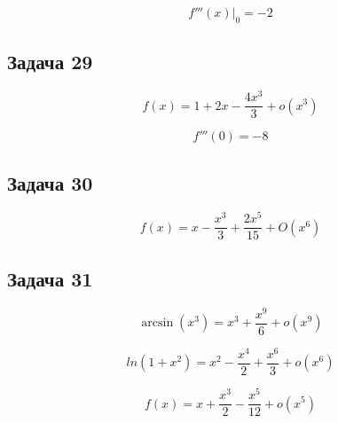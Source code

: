 \documentclass[a4paper,12pt]{article}
\begin{document}
\[
f'''(x)|_{0} =  -2
\]

\subsection{Задача 29}

\[
f(x) = 1 + 2x - \frac{4x^3}{3} + o(x^3)
\]

\[
f'''(0) = -8
\]

\subsection{Задача 30}
\[
f(x) = x - \frac{x^3}{3} + \frac{2x^5}{15} + O(x^6)
\]

\subsection{Задача 31}

\[
\arcsin(x^3) = x^3+\frac{x^9}{6} + o(x^9)
\]

\[
ln(1+x^2) = x^2-\frac{x^4}{2} + \frac{x^6}{3} + o(x^6)
\]

\[
f(x) = x + \frac{x^3}{2} - \frac{x^5}{12} + o(x^5)
\]
\end{document}
